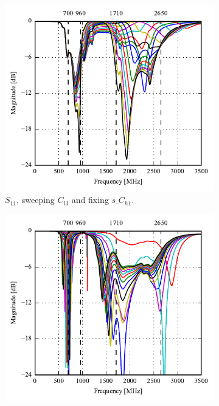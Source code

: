 \begin{figure}[htbp]
   \begin{subfigure}[b]{0.49\linewidth}
        \centering
        \includegraphics{img/tech_sol/nonresonant/simulation/talk_mode/s11_top_sweep.pdf}
        \caption{$S_{11}$, sweeping $C_{l3}$ and fixing $s\_C_{h1}$.}
    \end{subfigure}
    \hfill
    \begin{subfigure}[b]{0.49\linewidth}
        \centering
        \includegraphics{img/tech_sol/nonresonant/simulation/talk_mode/s22_side_sweep.pdf}

\end{subfigure}
\end{figure}
